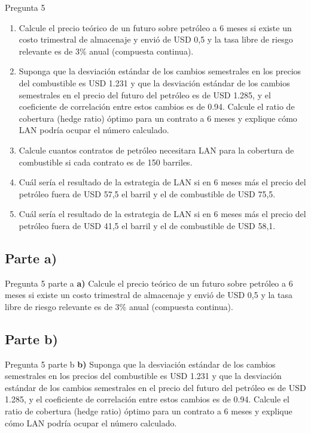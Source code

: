 \documentclass{beamer}
\begin{document}
\begin{frame}{Pregunta 5}
  \begin{enumerate}[label=\textbf{\alph*)}]
    \small
    \item Calcule el precio teórico de un futuro sobre petróleo a 6 meses si existe un costo trimestral de almacenaje y 
    envió de USD 0,5 y la tasa libre de riesgo relevante es de 3\% anual (compuesta continua).
    \item Suponga que la desviación estándar de los cambios semestrales en los precios del combustible es USD 1.231 y 
    que la desviación estándar de los cambios semestrales en el precio del futuro del petróleo es de USD 1.285, y el coeficiente 
    de correlación entre estos cambios es de 0.94. Calcule el ratio de cobertura (hedge ratio) óptimo para un contrato a 6 meses 
    y explique cómo LAN podría ocupar el número calculado.
    \item Calcule cuantos contratos de petróleo necesitara LAN para la cobertura de combustible si cada contrato es de 150 barriles.
    \item Cuál sería el resultado de la estrategia de LAN si en 6 meses más el precio del petróleo fuera de USD 57,5 el barril y el de combustible de USD 75,5.
    \item Cuál sería el resultado de la estrategia de LAN si en 6 meses más el precio del petróleo fuera de USD 41,5 el barril y el de combustible de USD 58,1.
  \end{enumerate}
\end{frame}


\subsection{Parte a)}
  \begin{frame}{Pregunta 5 parte a}
    \textbf{a)} Calcule el precio teórico de un futuro sobre petróleo a 6 meses si existe un costo trimestral de almacenaje y 
    envió de USD 0,5 y la tasa libre de riesgo relevante es de 3\% anual (compuesta continua).
    
  \end{frame}

\subsection{Parte b)}
  \begin{frame}{Pregunta 5 parte b}
    \textbf{b)} Suponga que la desviación estándar de los cambios semestrales en los precios del combustible es USD 1.231 y 
    que la desviación estándar de los cambios semestrales en el precio del futuro del petróleo es de USD 1.285, y el coeficiente 
    de correlación entre estos cambios es de 0.94. Calcule el ratio de cobertura (hedge ratio) óptimo para un contrato a 6 meses 
    y explique cómo LAN podría ocupar el número calculado.
  \end{frame}
\end{document}
